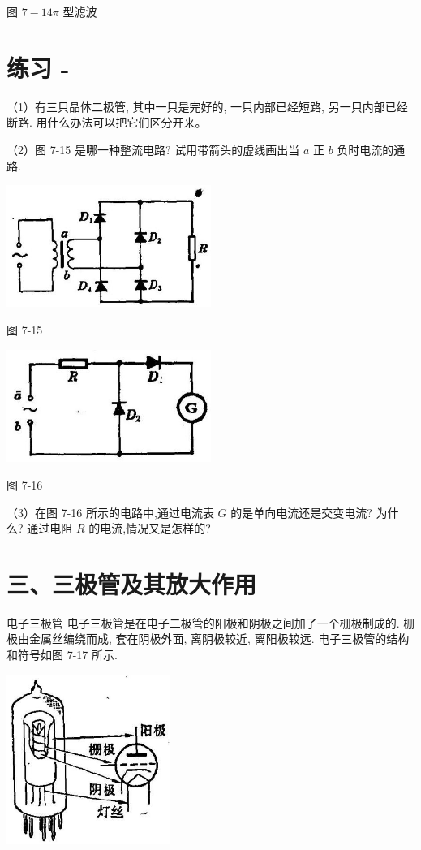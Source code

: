 \documentclass[10pt]{article}
\begin{document}
图 \(7 - {14\pi }\) 型滤波

\section*{练习 -}

（1）有三只晶体二极管, 其中一只是完好的, 一只内部已经短路, 另一只内部已经断路. 用什么办法可以把它们区分开来。

（2）图 7-15 是哪一种整流电路? 试用带箭头的虚线画出当 \(a\) 正 \(b\) 负时电流的通路.

\begin{center}
\includegraphics[max width=0.5\textwidth]{images/01913056-1f15-74d8-9184-9aab52c9d66b_230_147379.jpg}
\end{center}

图 7-15

\begin{center}
\includegraphics[max width=0.5\textwidth]{images/01913056-1f15-74d8-9184-9aab52c9d66b_230_530920.jpg}
\end{center}

图 7-16

（3）在图 7-16 所示的电路中,通过电流表 \(G\) 的是单向电流还是交变电流? 为什么? 通过电阻 \(R\) 的电流,情况又是怎样的?

\section*{三、三极管及其放大作用}

电子三极管 电子三极管是在电子二极管的阳极和阴极之间加了一个栅极制成的. 栅极由金属丝编绕而成, 套在阴极外面, 离阴极较近, 离阳极较远. 电子三极管的结构和符号如图 7-17 所示.

\begin{center}
\includegraphics[max width=0.4\textwidth]{images/01913056-1f15-74d8-9184-9aab52c9d66b_231_679128.jpg}
\end{center}
\end{document}
